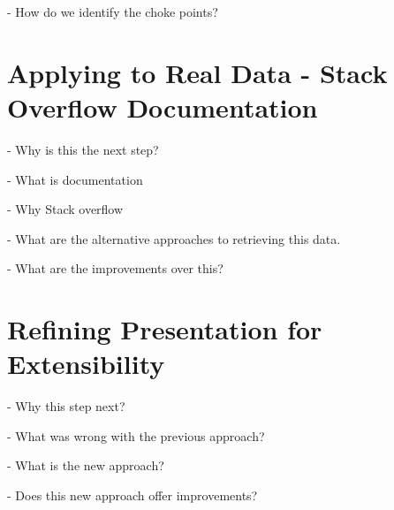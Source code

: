 - How do we identify the choke points?

\section{Applying to Real Data - Stack Overflow Documentation}

- Why is this the next step?

- What is documentation

- Why Stack overflow

- What are the alternative approaches to retrieving this data.

- What are the improvements over this?

\section{Refining Presentation for Extensibility}

- Why this step next?

- What was wrong with the previous approach?

- What is the new approach?

- Does this new approach offer improvements?

%
%
%
%
%
%
%
%